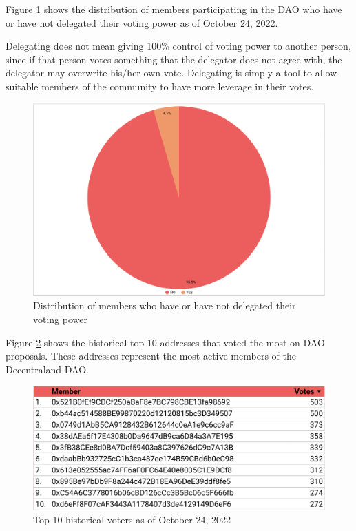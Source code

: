\documentclass[MSE,Master,english]{twbook}%
\begin{document}
Figure \ref{fig:delegation_ratio} shows the distribution of members participating in the DAO who have or have not delegated their voting power as of October 24, 2022. 

Delegating does not mean giving 100\% control of voting power to another person, since if that person votes something that the delegator does not agree with, the delegator may overwrite his/her own vote. Delegating is simply a tool to allow suitable members of the community to have more leverage in their votes.

\begin{figure}[H]
  \centering
  \includegraphics[width=\textwidth]{metrics/delegation_ratio.png}
  \caption{Distribution of members who have or have not delegated their voting power}
  \label{fig:delegation_ratio}
\end{figure}

Figure \ref{fig:top_voters} shows the historical top 10 addresses that voted the most on DAO proposals. These addresses represent the most active members of the Decentraland DAO.
\begin{figure}[H]
  \centering
  \includegraphics[width=\textwidth]{metrics/top_voters.png}
  \caption{Top 10 historical voters as of October 24, 2022}
  \label{fig:top_voters}
\end{figure}
\end{document}
